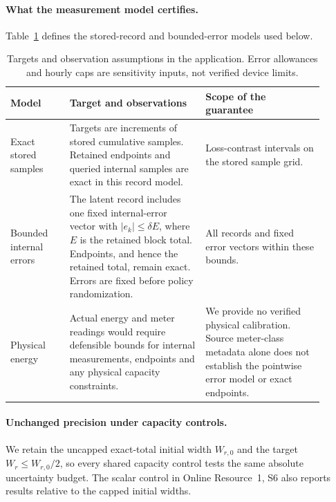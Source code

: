 \paragraph{What the measurement model certifies.}
Table~\ref{tab:measurement-assumptions} defines the stored-record and
bounded-error models used below.

\begin{table}[htbp]
\centering\small
\caption{Targets and observation assumptions in the application. Error
allowances and hourly caps are sensitivity inputs, not verified device limits.}
\label{tab:measurement-assumptions}
\begin{tabular}{>{\raggedright\arraybackslash}p{0.17\linewidth}>{\raggedright\arraybackslash}p{0.39\linewidth}>{\raggedright\arraybackslash}p{0.34\linewidth}}
\toprule
Model & Target and observations & Scope of the guarantee\\
\midrule
Exact stored samples
& Targets are increments of stored cumulative samples. Retained endpoints
and queried internal samples are exact in this record model.
& Loss-contrast intervals on the stored sample grid.\\
Bounded internal errors
& The latent record includes one fixed internal-error vector with
$|e_k|\leq\delta E$, where $E$ is the retained block total. Endpoints, and hence the
retained total, remain exact. Errors are fixed before policy randomization.
& All records and fixed error vectors within these bounds.\\
Physical energy
& Actual energy and meter readings would require defensible bounds for
internal measurements, endpoints and any physical capacity constraints.
& We provide no verified physical calibration. Source meter-class metadata
alone does not establish the pointwise error model or exact endpoints.\\
\bottomrule
\end{tabular}
\end{table}

\paragraph{Unchanged precision under capacity controls.}
We retain the uncapped exact-total initial width $W_{r,0}$ and the target
$W_r\leq W_{r,0}/2$, so every shared capacity control tests the same
absolute uncertainty budget. The scalar control in Online Resource~1, S6
also reports results relative to the capped initial widths.
